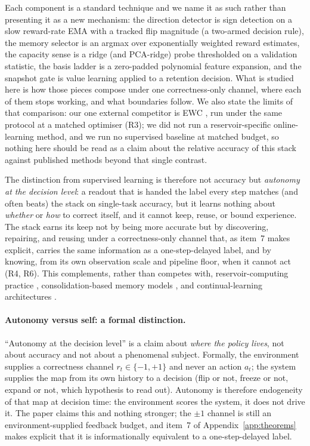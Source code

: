\documentclass[preprint,12pt]{elsarticle}
\begin{document}
Each component is a standard technique and we name it as such rather than
presenting it as a new mechanism: the direction detector is sign detection
on a slow reward-rate EMA with a tracked flip magnitude (a two-armed
decision rule), the memory selector is an argmax over exponentially weighted
reward estimates, the capacity sense is a ridge (and PCA-ridge) probe
thresholded on a validation statistic, the basis ladder is a zero-padded
polynomial feature expansion, and the snapshot gate is value learning
applied to a retention decision. What is studied here is how those pieces
compose under one correctness-only channel, where each of them stops
working, and what boundaries follow. We also state the limits of that
comparison: our one external competitor is EWC \cite{kirkpatrick2017}, run
under the same protocol at a matched optimiser (R3); we did not run a
reservoir-specific online-learning method, and we run no supervised baseline
at matched budget, so nothing here should be read as a claim about the
relative accuracy of this stack against published methods beyond that single
contrast.

The distinction from supervised learning is therefore not accuracy but
\emph{autonomy at the decision level}: a readout that is handed the label
every step matches (and often beats) the stack on single-task accuracy, but
it learns nothing about \emph{whether} or \emph{how} to correct itself, and
it cannot keep, reuse, or bound experience. The stack earns its keep not by
being more accurate but by discovering, repairing, and reusing under a
correctness-only channel that, as item~7 makes explicit, carries the
same information as a one-step-delayed label, and by knowing, from its own
observation scale and pipeline floor, when it cannot act (R4, R6). This complements, rather than competes with,
reservoir-computing practice
\cite{lukosevicius2009,tanaka2019}, consolidation-based memory models
\cite{fusi2005,benna2016}, and continual-learning architectures
\cite{parisi2019,kirkpatrick2017}.

\paragraph{Autonomy versus self: a formal distinction.}
``Autonomy at the decision level'' is a claim about \emph{where the policy
lives}, not about accuracy and not about a phenomenal subject. Formally, the
environment supplies a correctness channel $r_t\in\{-1,+1\}$ and never an
action $a_t$; the system supplies the map from its own history to a decision
(flip or not, freeze or not, expand or not, which hypothesis to read out).
Autonomy is therefore endogeneity of that map at decision time: the
environment scores the system, it does not drive it. The paper claims this
and nothing stronger; the $\pm1$ channel is still an environment-supplied
feedback budget, and item~7 of Appendix~\ref{app:theorems} makes explicit
that it is informationally equivalent to a one-step-delayed label.
\end{document}
